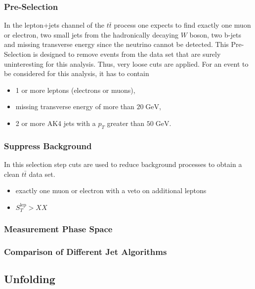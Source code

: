 \subsubsection{Pre-Selection}
\label{sssec:PreSel}
	In the lepton+jets channel of the $t\bar{t}$ process one expects to find exactly one muon or electron, two small jets from the hadronically decaying $W$ boson, two b-jets and missing transverse energy since the neutrino cannot be detected. This Pre-Selection is designed to remove events from the data set that are surely uninteresting for this analysis. Thus, very loose cuts are applied. For an event to be considered for this analysis, it has to contain
	\begin{itemize}
	\item 1 or more leptons (electrons or muons),
	\item missing transverse energy of more than $20\;\text{GeV}$,
	\item 2 or more AK4 jets with a $p_T$ greater than $50\;\text{GeV}$.
	\end{itemize}
	
\subsubsection{Suppress Background}
\label{sssec:BackSel}
	In this selection step cuts are used to reduce background processes to obtain a clean $t\bar{t}$ data set. 
	\begin{itemize}
	\item exactly one muon or electron with a veto on additional leptons
	\item $S_T^\text{lep} > XX$
	\end{itemize}
\subsubsection{Measurement Phase Space}
\label{sssec:FinalSel}
\subsubsection{Comparison of Different Jet Algorithms}
\subsection{Unfolding}